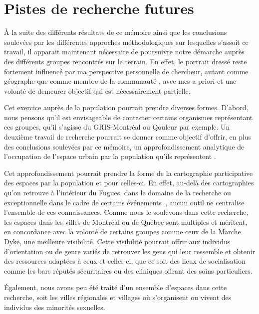 \section*{Pistes de recherche futures}
\label{sec:pistes_de_recherches}

À la suite des différents résultats de ce mémoire ainsi que les conclusions soulevées par les différentes approches méthodologiques sur lesquelles s'assoit ce travail, il apparait maintenant nécessaire de poursuivre notre démarche auprès des différents groupes rencontrés sur le terrain.
En effet, le portrait dressé reste fortement influencé par ma perspective personnelle de chercheur, autant comme géographe que comme membre de la communauté \lgbt{}, avec mes a priori et une volonté de demeurer objectif qui est nécessairement partielle.

Cet exercice auprès de la population pourrait prendre diverses formes.
D'abord, nous pensons qu'il est envisageable de contacter certains organismes représentant ces groupes, qu'il s'agisse du GRIS-Montréal ou Qouleur par exemple.
Un deuxième travail de recherche pourrait se donner comme objectif d'offrir, en plus des conclusions soulevées par ce mémoire, un approfondissement analytique de l'occupation de l'espace urbain par la population qu'ils représentent .

Cet approfondissement pourrait prendre la forme de la cartographie participative des espaces \lgbt{} par la population et pour celles-ci.
En effet, au-delà des cartographies qu'on retrouve à l'intérieur du Fugues, dans le domaine de la recherche  ou exceptionnelle dans le cadre de certains événements~\parencite{Pervers/Cite2015}, aucun outil ne centralise l'ensemble de ces connaissances.
Comme nous le soulevons dans cette recherche, les espaces \lgbt{} dans les villes de Montréal ou de Québec sont multiples et méritent, en concordance avec la volonté de certains groupes comme ceux de la Marche Dyke, une meilleure visibilité.
Cette visibilité pourrait offrir aux individus d'orientation ou de genre variés de retrouver les gens qui leur ressemble et obtenir des ressources adaptées à ceux et celles-ci, que ce soit des lieux de socialisation comme les bars réputés sécuritaires ou des cliniques offrant des soins particuliers.

Également, nous avons peu été traité d'un ensemble d'espaces dans cette recherche, soit les villes régionales et villages où s'organisent ou vivent des individus des minorités sexuelles.


